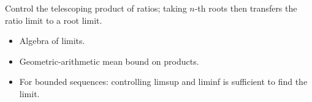 \begin{remark*}
Control the telescoping product of ratios; taking $n$-th roots then transfers the ratio limit to a root limit.
\end{remark*}

\begin{remark*}[Dependencies]
\begin{itemize}
  \item Algebra of limits.
  \item Geometric-arithmetic mean bound on products.
  \item For bounded sequences: controlling limsup and liminf is sufficient to find the limit.
\end{itemize}
\end{remark*}
